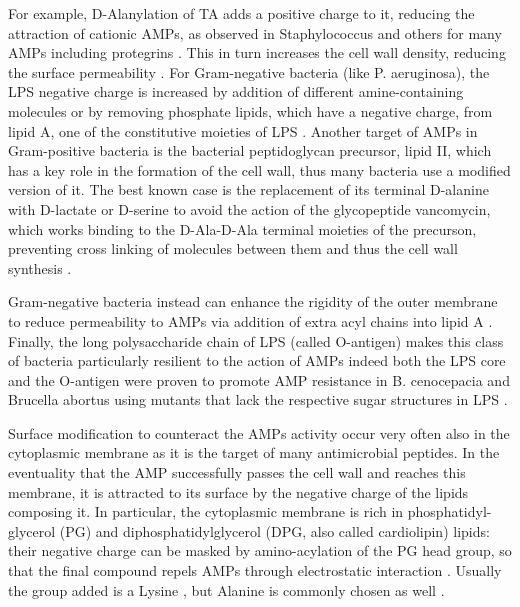 For example, D-Alanylation of TA adds a positive charge to it, reducing the attraction of cationic AMPs, as observed in Staphylococcus and others for many AMPs including protegrins \cite{Peschel1999,Fabretti2006,Saar-Dover2012}.
%
This in turn increases the cell wall density, reducing the surface permeability \cite{Saar-Dover2012}.
For Gram-negative bacteria (like P. aeruginosa), the LPS negative charge is increased by addition of different amine-containing molecules \cite{Moskowitz2004,Gunn1998} or by removing phosphate lipids, which have a negative charge, from lipid A, one of the constitutive moieties of LPS \cite{Wang2004MsbA,Wang2006}. Another target of AMPs in Gram-positive bacteria is the bacterial peptidoglycan precursor, lipid II, which has a key role in the formation of the cell wall, thus many bacteria use a modified version of it.
The best known case is the replacement of its terminal D-alanine with D-lactate or D-serine \cite{Bugg1991} to avoid the action of the glycopeptide vancomycin, which works binding to the D-Ala-D-Ala terminal moieties of the precurson, preventing cross linking of molecules between them and thus the cell wall synthesis \cite{Brotz1998}.

Gram-negative bacteria instead can enhance the rigidity of the outer membrane to reduce permeability to AMPs via addition of extra acyl chains into lipid A \cite{Guo1998,Bishop2000}. Finally, the long polysaccharide chain of LPS (called O-antigen) makes this class of bacteria particularly resilient to the action of AMPs \cite{Silhavy2010} indeed both the LPS core and the O-antigen were proven to promote AMP resistance in B. cenocepacia and Brucella abortus using mutants that lack the respective sugar structures in LPS \cite{Loutet2006,Allen1998}.

Surface modification to counteract the AMPs activity occur very often also in the cytoplasmic membrane as it is the target of many antimicrobial peptides. In the eventuality that the AMP successfully passes the cell wall and reaches this membrane, it is attracted to its surface by the negative charge of the lipids composing it. In particular, the cytoplasmic membrane is rich in phosphatidyl-glycerol (PG) and diphosphatidylglycerol (DPG, also called cardiolipin) lipids: their negative charge can be masked by amino-acylation of the PG head group, so that the final compound repels AMPs through electrostatic interaction \cite{Peschel2001}. Usually the group added is a Lysine \cite{Thedieck2006}, but Alanine is commonly chosen as well \cite{Klein2009}.

